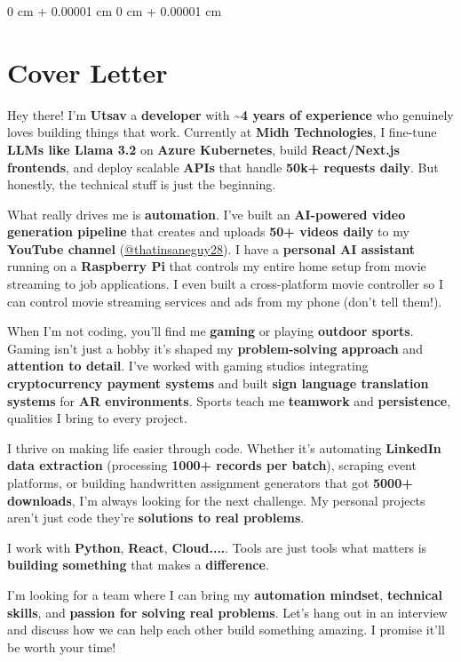 \documentclass[10pt, letterpaper]{article}
\newenvironment{onecolentry}{
    \begin{adjustwidth}{
        0 cm + 0.00001 cm
    }{
        0 cm + 0.00001 cm
    }
}{
    \end{adjustwidth}
} %
\begin{document}
\begin{onecolentry}
	\section{Cover Letter}
	\hspace{1cm}Hey there! I'm \textbf{Utsav} a \textbf{developer} with \textbf{\textasciitilde4 years of experience} who genuinely loves building things that work. Currently at \textbf{Midh Technologies}, I fine-tune \textbf{LLMs like Llama 3.2} on \textbf{Azure Kubernetes}, build \textbf{React/Next.js frontends}, and deploy scalable \textbf{APIs} that handle \textbf{50k+ requests daily}. But honestly, the technical stuff is just the beginning.
	
	\vspace{0.05cm}
	\hspace{1cm}What really drives me is \textbf{automation}. I've built an \textbf{AI-powered video generation pipeline} that creates and uploads \textbf{50+ videos daily} to my \textbf{YouTube channel} (\href{https://www.youtube.com/@ThatInsaneGuy}{@thatinsaneguy28}). I have a \textbf{personal AI assistant} running on a \textbf{Raspberry Pi} that controls my entire home setup from movie streaming to job applications. I even built a cross-platform movie controller so I can control movie streaming services and ads from my phone (don't tell them!).
	
	\vspace{0.05cm}
	\hspace{1cm}When I'm not coding, you'll find me \textbf{gaming} or playing \textbf{outdoor sports}. Gaming isn't just a hobby it's shaped my \textbf{problem-solving approach} and \textbf{attention to detail}. I've worked with gaming studios integrating \textbf{cryptocurrency payment systems} and built \textbf{sign language translation systems} for \textbf{AR environments}. Sports teach me \textbf{teamwork} and \textbf{persistence}, qualities I bring to every project.
	
	\vspace{0.05cm}
	\hspace{1cm}I thrive on making life easier through code. Whether it's automating \textbf{LinkedIn data extraction} (processing \textbf{1000+ records per batch}), scraping event platforms, or building handwritten assignment generators that got \textbf{5000+ downloads}, I'm always looking for the next challenge. My personal projects aren't just code they're \textbf{solutions to real problems}.
	
	\vspace{0.15cm}
	\hspace{0.75cm}I work with \textbf{Python}, \textbf{React}, \textbf{Cloud}\textbf{....}. Tools are just tools what matters is \textbf{building something} that makes a \textbf{difference}.
	
	\vspace{0.15cm}
	\hspace{1cm}I'm looking for a team where I can bring my \textbf{automation mindset}, \textbf{technical skills}, and \textbf{passion for solving real problems}. Let's hang out in an interview and discuss how we can help each other build something amazing. I promise it'll be worth your time!
\end{onecolentry}
\end{document}
